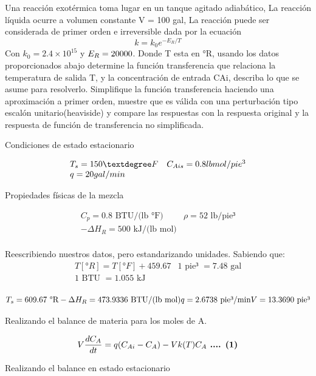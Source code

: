 \documentclass[
  letterpaper,
  DIV=11,
  numbers=noendperiod]{scrreprt}
\begin{document}
Una reacción exotérmica toma lugar en un tanque agitado adiabático, La
reacción líquida ocurre a volumen constante V = 100 gal, La reacción
puede ser considerada de primer orden e irreversible dada por la
ecuación \[
k = k_0e^{-E_R/T}
\] Con \(k_0=2.4\times 10^{15}\) y \(E_R = 20\space000\). Donde T esta
en °R, usando los datos proporcionados abajo determine la función
transferencia que relaciona la temperatura de salida T, y la
concentración de entrada CAi, describa lo que se asume para resolverlo.
Simplifique la función transferencia haciendo una aproximación a primer
orden, muestre que es válida con una perturbación tipo escalón
unitario(heaviside) y compare las respuestas con la respuesta original y
la respuesta de función de transferencia no simplificada.

Condiciones de estado estacionario

\[
\begin{array}{ll}
T_s = 150 \space °F & C_{Ais}=0.8\space lb\space mol/pie^3\\
q=20\space gal/min & \\
\end{array}
\]

Propiedades físicas de la mezcla

\[
\begin{array}{ll}
C_p=0.8\text{ BTU/(lb °F)}& \rho=52\text{ lb/pie³}\\
-\Delta H_R = 500\text{ kJ/(lb mol)}\\
\end{array}
\]

Reescribiendo nuestros datos, pero estandarizando unidades. Sabiendo
que: \[
\begin{array}{cc}
T[°R]= T[°F]+459.67 &1\text{ pie³ } = 7.48\text{ gal}\\
1\text{ BTU } = 1.055\text{ kJ}\\
\end{array}
\]

\[
T_s = 609.67 \text{ °R}\\
-\Delta H_R = 473.9336 \text{ BTU/(lb mol)}\\
q = 2.6738 \text{ pie³/min}\\
V = 13.3690\text{ pie³}
\]

Realizando el balance de materia para los moles de A.

\[
V\frac{dC_A}{dt}=q(C_{Ai}-C_A)-Vk(T)C_A \space\space\space\space\textbf{ .... (1)}
\]

Realizando el balance en estado estacionario
\end{document}
